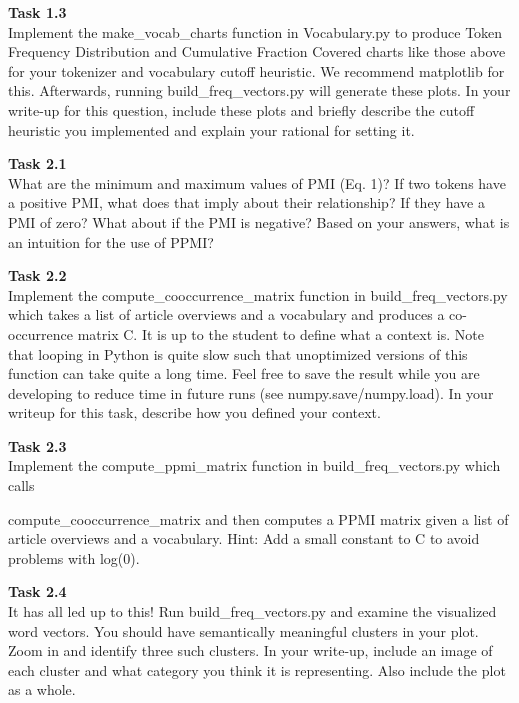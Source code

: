 \documentclass[12pt,article]{article}
\newenvironment{task}[2][Task]
    { \begin{mdframed}[backgroundcolor=gray!20] \textbf{#1 #2} \\}
    {  \end{mdframed}}
\begin{document}
\begin{task}{1.3} 
Implement the make\_vocab\_charts function in Vocabulary.py to produce Token Frequency Distribution and Cumulative Fraction Covered charts like those above for your tokenizer and vocabulary cutoff heuristic. We recommend matplotlib for this. Afterwards, running build\_freq\_vectors.py will generate these plots. In your write-up for this question, include these plots and briefly describe the cutoff heuristic you implemented and explain your rational for setting it.
\end{task}

\newpage
\begin{task}{2.1}
What are the minimum and maximum values of PMI (Eq. 1)? If two tokens have a positive PMI, what does that imply about their relationship? If they have a PMI of zero? What about if the PMI is negative? Based on your answers, what is an intuition for the use of PPMI?
\end{task}

\begin{task}{2.2}
Implement the compute\_cooccurrence\_matrix function in build\_freq\_vectors.py which takes a list of article overviews and a vocabulary and produces a co-occurrence matrix C. It is up to the student to define what a context is. Note that looping in Python is quite slow such that unoptimized versions of this function can take quite a long time. Feel free to save the result while you are developing to reduce time in future runs (see numpy.save/numpy.load). In your writeup for this task, describe how you defined your context.
\end{task}

\begin{task}{2.3} 
Implement the compute\_ppmi\_matrix function in build\_freq\_vectors.py which calls 

compute\_cooccurrence\_matrix and then computes a PPMI matrix given a list of article overviews and a vocabulary. Hint: Add a small constant to C to avoid problems with log(0).
\end{task}

\begin{task}{2.4} 
It has all led up to this! Run build\_freq\_vectors.py and examine the visualized word vectors. You should have semantically meaningful clusters in your plot. Zoom in and identify three such clusters. In your write-up, include an image of each cluster and what category you think it is representing. Also include the plot as a whole.
\end{task}
\end{document}
